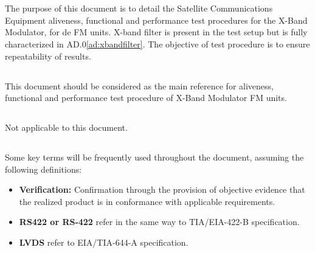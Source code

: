 \section{}

\subsection{}

The purpose of this document is to detail the Satellite Communications 
Equipment aliveness, functional and performance test procedures for the X-Band Modulator, for de FM units.
X-band filter is present in the test setup but is fully characterized in AD.0\ref{ad:xbandfilter}. 
The objective of test procedure is to ensure repeatability of results. 

\subsection{}

This document should be considered as the main reference for aliveness, 
functional and performance test procedure of X-Band Modulator FM units. 

\subsection{}

Not applicable to this document.

\subsection{}


Some key terms will be frequently used throughout the document, assuming the following definitions:

\begin{itemize}

\item \textbf{Verification:} Confirmation through the provision of objective evidence that the realized product is in conformance with applicable requirements.

\item \textbf{RS422 or RS-422} refer in the same way to TIA/EIA-422-B specification.

\item \textbf{LVDS} refer to EIA/TIA-644-A specification.

\end{itemize}







